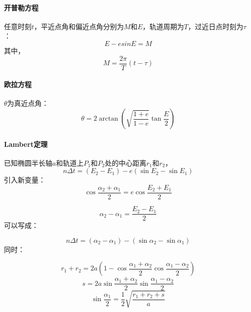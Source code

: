 \paragraph{开普勒方程}
任意时刻$t$，平近点角和偏近点角分别为$M$和$E$，轨道周期为$T$，过近日点时刻为$\tau$：
\begin{equation}
	E -esinE=M
\end{equation}
其中，
\begin{equation}
	M=\frac{2\pi}{T}\left(t-\tau \right)
\end{equation}
\paragraph{欧拉方程}
$\theta$为真近点角：
\begin{equation}
	\theta  = 2 \arctan \left(\sqrt{\frac{1+e}{1-e}}\tan \frac{E}{2}\right)
\end{equation}
\paragraph{Lambert定理}
已知椭圆半长轴$a$和轨道上$P_{1}$和$P_{2}$处的中心距离$r_{1}$和$r_{2}$，
\begin{equation}
	n\Delta t = (E_{2}-E_{1})-e(\sin E_{2}-\sin E_{1})
\end{equation}
引入新变量：
\begin{equation}
	\cos \frac{\alpha_{2}+\alpha_{1}}{2}=e\cos \frac{E_{2}+E_{1}}{2}
\end{equation}

\begin{equation}
	\alpha_{2}-\alpha_{1}=\frac{E_{2}-E_{1}}{2}
\end{equation}
可以写成：

\begin{equation}
	n \Delta t=(\alpha_{2}-\alpha_{1})-(\sin \alpha_{2}-\sin \alpha_{1})
\end{equation}
同时：

\begin{equation}
	r_{1}+r_{2}=2a\left(1-\cos \frac{\alpha_{1}+\alpha_{2}}{2}\cos \frac{\alpha_{1}-\alpha_{2}}{2}\right)
\end{equation}
\begin{equation}
	s=2a\sin \frac{\alpha_{1}+\alpha_{2}}{2}\sin\frac{\alpha_{1}-\alpha_{2}}{2}
\end{equation}
\begin{equation}
	\sin \frac{\alpha_{1}}{2}=\frac{1}{2}\sqrt{\frac{r_{1}+r_{2}+s}{a}}
\end{equation}	

